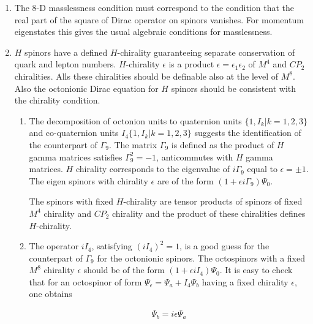 \documentclass[10pt,epsf]{article}
\begin{document}
{\begin{enumerate}
The octonionic units are analogs of Pauli sigma matrices and the first problem is caused by the lacking anticommutativity of the real unit with other octonion units. The Dirac equation  however makes sense also in this case. 

\item The   8-D masslessness condition   must correspond  to the condition that the  real part of the square of Dirac operator on spinors vanishes. For momentum eigenstates this gives  the usual  algebraic conditions for masslessness.
 
\item  $H$ spinors have a defined $H$-chirality guaranteeing separate conservation of quark and lepton numbers. $H$-chirality $\epsilon$ is a product $\epsilon=\epsilon_1\epsilon_2$  of $M^4$ and $CP_2$ chiralities. Alls these chiralities should be definable also at the level of $M^8$. Also the  octonionic Dirac equation for $H$ spinors should  be consistent with the chirality condition.

\begin{enumerate}

\item The decomposition of octonion units to quaternion  units $\{1,I_k\vert k=1,2,3\}$ and  co-quaternion units  $I_4\{1,I_k\vert k=1,2,3\}$ suggests the identification of the counterpart of $\Gamma_9$.   The matrix $\Gamma_9$  is  defined as the  product of $H$ gamma matrices  satisfies $\Gamma_9^2=-1$, anticommutes with $H$ gamma matrices.   $H$ chirality  corresponds to the eigenvalue of $i\Gamma_9$ equal to $\epsilon=\pm 1$. The eigen spinors  with chirality $\epsilon$ are of the form $(1+\epsilon i\Gamma_9)\Psi_0$.

The spinors with fixed $H$-chirality are tensor products of spinors of fixed $M^4$ chirality and $CP_2$ chirality and the product of these chiralities defines $H$-chirality.

\item The operator $iI_4$, satisfying  $(iI_4)^2=1$, is a good guess for the counterpart of  $\Gamma_9$  for the octonionic spinors.  The octospinors with a fixed $M^8$ chirality $\epsilon$ should be of the form $(1+\epsilon iI_4)\Psi_0$.   It is easy to check that  for an octospinor  of form $\Psi_{\epsilon}= \Psi_a+ I_4\Psi_b$  having a fixed chirality $\epsilon$,  one obtains 

\begin{eqnarray}
\Psi_b=i\epsilon\Psi_a  
\end{eqnarray}


\end{enumerate}
\end{enumerate}}
\end{document}
